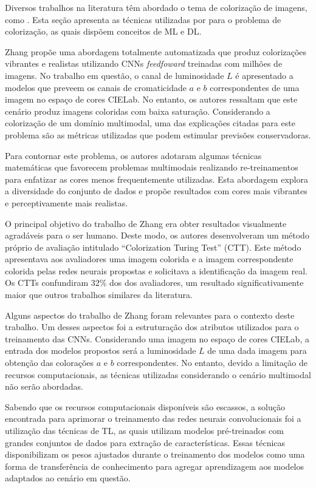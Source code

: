 Diversos trabalhos na literatura têm abordado o tema de colorização de imagens, como \cite{ref:rel-zhang,ref:rel-deshpande,ref:rel-welsh}. Esta seção apresenta as técnicas utilizadas por \cite{ref:rel-zhang} para o problema de colorização, as quais dispõem conceitos de ML e DL.

Zhang propõe uma abordagem totalmente automatizada que produz colorizações vibrantes e realistas utilizando CNNs \emph{feedfoward} treinadas com milhões de imagens. No trabalho em questão, o canal de luminosidade $L$ é apresentado a modelos que preveem os canais de cromaticidade $a$ e $b$ correspondentes de uma imagem no espaço de cores CIELab. No entanto, os autores ressaltam que este cenário produz imagens coloridas com baixa saturação. Considerando a colorização de um domínio multimodal, uma das explicações citadas para este problema são as métricas utilizadas que podem estimular previsões conservadoras.
 
Para contornar este problema, os autores adotaram algumas técnicas matemáticas que favorecem problemas multimodais realizando re-treinamentos para enfatizar as cores menos frequentemente utilizadas. Esta abordagem explora a diversidade do conjunto de dados e propõe resultados com cores mais vibrantes e perceptivamente mais realistas.

O principal objetivo do trabalho de Zhang era obter resultados visualmente agradáveis para o ser humano. Deste modo, os autores desenvolveram um método próprio de avaliação intitulado ``Colorization Turing Test'' (CTT). Este método apresentava aos avaliadores uma imagem colorida e a imagem correspondente colorida pelas redes neurais propostas e solicitava a identificação da imagem real. Os CTTs confundiram $32\%$ dos dos avaliadores, um resultado significativamente maior que outros trabalhos similares da literatura.

Alguns aspectos do trabalho de Zhang foram relevantes para o contexto deste trabalho. Um desses aspectos foi a estruturação dos atributos utilizados para o treinamento das CNNs. Considerando uma imagem no espaço de cores CIELab, a entrada dos modelos propostos será a luminosidade $L$ de uma dada imagem para obtenção das colorações $a$ e $b$ correspondentes. No entanto, devido a limitação de recursos computacionais, as técnicas utilizadas considerando o cenário multimodal não serão abordadas.

Sabendo que os recursos computacionais disponíveis são escassos, a solução encontrada para aprimorar o treinamento das redes neurais convolucionais foi a utilização das técnicas de TL, as quais utilizam modelos pré-treinados com grandes conjuntos de dados para extração de características. Essas técnicas disponibilizam os pesos ajustados durante o treinamento dos modelos como uma forma de transferência de conhecimento para agregar aprendizagem aos modelos adaptados ao cenário em questão.  
